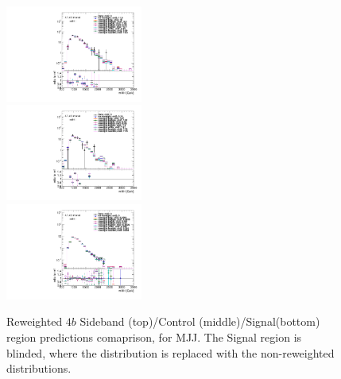 \begin{figure}[htbp!]
\begin{center}
\includegraphics[width=0.4\textwidth,angle=-90]{figures/boosted/AppendixReweight/Compare/Data_FourTag_Sideband_directcompare_mHH_l_1.pdf}\\
\includegraphics[width=0.4\textwidth,angle=-90]{figures/boosted/AppendixReweight/Compare/Data_FourTag_Control_directcompare_mHH_l_1.pdf}\\
\includegraphics[width=0.4\textwidth,angle=-90]{figures/boosted/AppendixReweight/Compare/Data_FourTag_Signal_directcompare_mHH_l_1.pdf}
\caption{Reweighted $4b$ Sideband (top)/Control (middle)/Signal(bottom) region predictions comaprison, for MJJ. The Signal region is blinded, where the distribution is replaced with the non-reweighted distributions.}
\label{fig:app-rw-comp-4b}
\end{center}
\end{figure}


